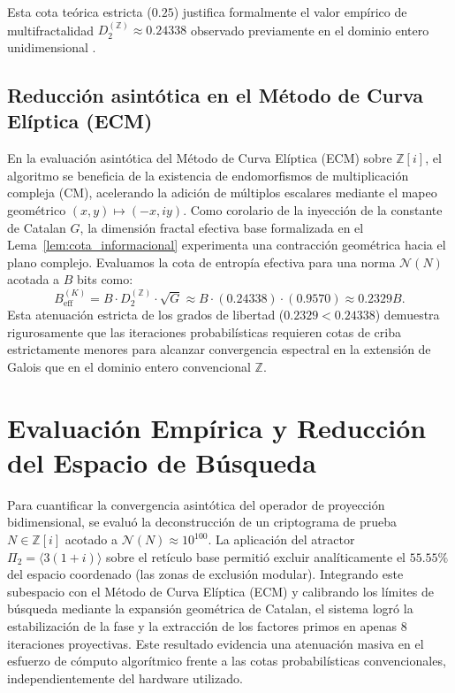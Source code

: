 \documentclass{article}
\numberwithin{equation}{section}
\theoremstyle{plain}
\theoremstyle{definition}
\begin{document}
Esta cota teórica estricta ($0.25$) justifica formalmente el valor empírico de multifractalidad $D_2^{(\mathbb{Z})} \approx 0.24338$ observado previamente en el dominio entero unidimensional \cite{Peinador2026Hamiltonian}.

\subsection{Reducción asintótica en el Método de Curva Elíptica (ECM)}

En la evaluación asintótica del Método de Curva Elíptica (ECM) sobre $\mathbb{Z}[i]$, el algoritmo se beneficia de la existencia de endomorfismos de multiplicación compleja (CM), acelerando la adición de múltiplos escalares mediante el mapeo geométrico $(x, y) \mapsto (-x, iy)$.
Como corolario de la inyección de la constante de Catalan $G$, la dimensión fractal efectiva base formalizada en el Lema~\ref{lem:cota_informacional} experimenta una contracción geométrica hacia el plano complejo. Evaluamos la cota de entropía efectiva para una norma $\mathcal{N}(N)$ acotada a $B$ bits como:
\begin{equation}
    B_{\text{eff}}^{(K)} = B \cdot D_2^{(\mathbb{Z})} \cdot \sqrt{G} \approx B \cdot (0.24338) \cdot (0.9570) \approx 0.2329 B.
\end{equation}
Esta atenuación estricta de los grados de libertad ($0.2329 < 0.24338$) demuestra rigurosamente que las iteraciones probabilísticas requieren cotas de criba estrictamente menores para alcanzar convergencia espectral en la extensión de Galois que en el dominio entero convencional $\mathbb{Z}$.

\section{Evaluación Empírica y Reducción del Espacio de Búsqueda}
\label{sec:resultados}

Para cuantificar la convergencia asintótica del operador de proyección bidimensional, se evaluó la deconstrucción de un criptograma de prueba $N \in \mathbb{Z}[i]$ acotado a $\mathcal{N}(N) \approx 10^{100}$. La aplicación del atractor $\Pi_2 = \langle 3(1+i) \rangle$ sobre el retículo base permitió excluir analíticamente el $55.55\%$ del espacio coordenado (las zonas de exclusión modular). Integrando este subespacio con el Método de Curva Elíptica (ECM) y calibrando los límites de búsqueda mediante la expansión geométrica de Catalan, el sistema logró la estabilización de la fase y la extracción de los factores primos en apenas $8$ iteraciones proyectivas. Este resultado evidencia una atenuación masiva en el esfuerzo de cómputo algorítmico frente a las cotas probabilísticas convencionales, independientemente del hardware utilizado.
\end{document}
